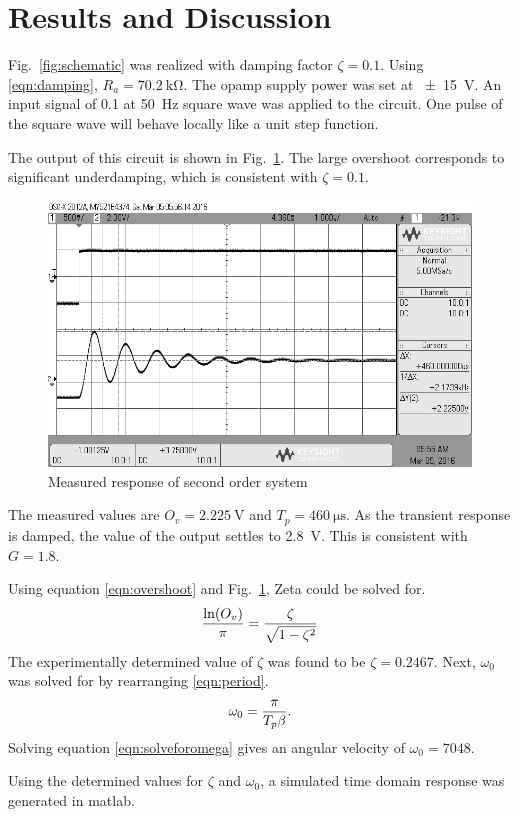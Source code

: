 \section{Results and Discussion}\label{sec:results-and-discussion}
Fig.~\ref{fig:schematic} was realized with damping factor $\zeta = 0.1$.
Using \eqref{eqn:damping}, $R_a = \SI{70.2}{\kilo\ohm}$.
The opamp supply power was set at \SI{+-15}{\volt}.
An input signal of 0.1\si{\voltpp} at \SI{50}{\hertz} square wave was applied to the circuit.
One pulse of the square wave will behave locally like a unit step function.

The output of this circuit is shown in Fig.~\ref{fig:overshoot}.
The large overshoot corresponds to significant underdamping, which is consistent with $\zeta = 0.1$.

\pagebreak

\begin{figure}[tbph]
	\centering
	\includegraphics[width=0.7\linewidth]{graphics/overshoot}
	\caption{Measured response of second order system}
	\label{fig:overshoot}
\end{figure}

The measured values are $O_v = \SI{2.225}{\volt}$ and $T_p = \SI{460}{\micro\second}$.
As the transient response is damped, the value of the output settles to \SI{2.8}{\volt}.
This is consistent with $G = 1.8$.

Using equation \eqref{eqn:overshoot} and Fig.~\ref{fig:overshoot}, Zeta could be solved for. 
\begin{equation}\label{eqn:solveforzeta}
	{\ln(O_v) \over \pi} = {\zeta \over \sqrt{1 - \zeta^2}}
\end{equation}
The experimentally determined value of $\zeta$ was found to be $\zeta = 0.2467$.
Next, $\omega_0$ was solved for by rearranging \eqref{eqn:period}.
\begin{equation}\label{eqn:solveforomega}
	\omega_0 = { \pi \over T_p\beta }.
\end{equation} 
Solving equation \eqref{eqn:solveforomega} gives an angular velocity of $\omega_0 = 7048$.

Using the determined values for $\zeta$ and $\omega_0$, a simulated time domain response was generated in matlab.